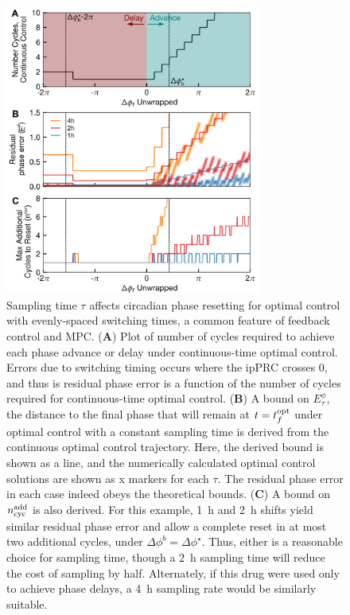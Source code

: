 \begin{figure}[p]
    \begin{center}
	\includegraphics[width=8.4cm]{chap6/figures/figure_5.png}
\end{center}
	\caption{\label{fig:stepsize2} Sampling time $\tau$ affects circadian phase resetting for optimal control with evenly-spaced switching times, a common feature of feedback control and MPC. (\textbf{A}) Plot of number of cycles required to achieve each phase advance or delay under continuous-time optimal control. Errors due to switching timing occurs where the ipPRC crosses 0, and thus is residual phase error is a function of the number of cycles required for continuous-time optimal control. (\textbf{B}) A bound on $E_\tau^\phi$, the distance to the final phase that will remain at $t = t_f^{\rm opt}$ under optimal control with a constant sampling time is derived from the continuous optimal control trajectory. Here, the derived bound is shown as a line, and the numerically calculated optimal control solutions are shown as x markers for each $\tau$. The residual phase error in each case indeed obeys the theoretical bounds. (\textbf{C}) A bound on $n_{\rm cyc}^{\rm add}$ is also derived. For this example, 1~h and 2~h shifts yield similar residual phase error and allow a complete reset in at most two additional cycles, under $\Delta\phi^b=\Delta\phi^\star$. Thus, either is a reasonable choice for sampling time, though a 2~h sampling time will reduce the cost of sampling by half. Alternately, if this drug were used only to achieve phase delays, a 4~h sampling rate would be similarly suitable.}
\end{figure}

